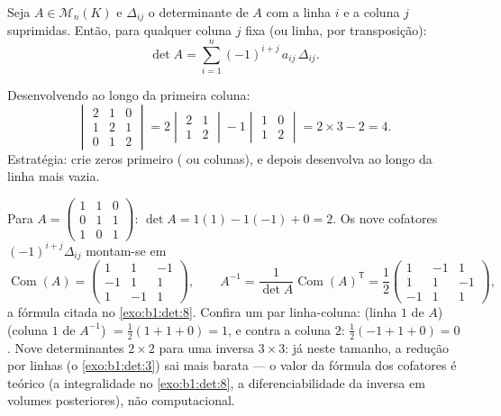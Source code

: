 \begin{theorem}\label{thm:b1:det:cofactor}
Seja $A \in \mathcal{M}_n(K)$ e $\Delta_{ij}$ o determinante de $A$ com a linha $i$ e a coluna
$j$ suprimidas. Então, para qualquer coluna $j$ fixa (ou linha, por
transposição):
\[
\det A = \sum_{i=1}^{n} (-1)^{i+j}\, a_{ij}\, \Delta_{ij} .
\]
\end{theorem}
\admitted

\begin{example}\label{ex:b1:det:cofactor}
Desenvolvendo ao longo da primeira coluna:
\[
\begin{vmatrix}
2 & 1 & 0\\
1 & 2 & 1\\
0 & 1 & 2
\end{vmatrix}
= 2\begin{vmatrix} 2 & 1\\ 1 & 2\end{vmatrix}
- 1\begin{vmatrix} 1 & 0\\ 1 & 2\end{vmatrix}
= 2 \times 3 - 2 = 4 .
\]
Estratégia: crie zeros primeiro ( ou colunas),
e depois desenvolva ao longo da linha mais vazia.
\end{example}

\begin{example}
\label{ex:b1:det:cofactorinverse}
Para $A = \begin{pmatrix} 1 & 1 & 0\\ 0 & 1 & 1\\ 1 & 0 &
1\end{pmatrix}$: $\det A = 1(1) - 1(-1) + 0 = 2$. Os nove cofatores $(-1)^{i+j}\Delta_{ij}$ montam-se em
\[
\operatorname{Com}(A) = \begin{pmatrix}
1 & 1 & -1\\
-1 & 1 & 1\\
1 & -1 & 1
\end{pmatrix},
\qquad
A^{-1} = \frac{1}{\det A}\operatorname{Com}(A)^{\mathsf T}
= \frac12\begin{pmatrix}
1 & -1 & 1\\
1 & 1 & -1\\
-1 & 1 & 1
\end{pmatrix},
\]
a fórmula citada no \cref{exo:b1:det:8}. Confira um par linha-coluna: (linha $1$
de $A$)(coluna $1$ de $A^{-1}$) $= \frac12(1 + 1
+ 0) = 1$, e contra a coluna $2$: $\frac12(-1 + 1 + 0) = 0$.
Nove determinantes $2\times2$ para uma inversa $3\times3$: já neste tamanho, a
redução por linhas (o \cref{exo:b1:det:3}) sai mais barata --- o valor da fórmula
dos cofatores é teórico (a integralidade no \cref{exo:b1:det:8}, a
diferenciabilidade da inversa em volumes posteriores), não
computacional.
\end{example}

